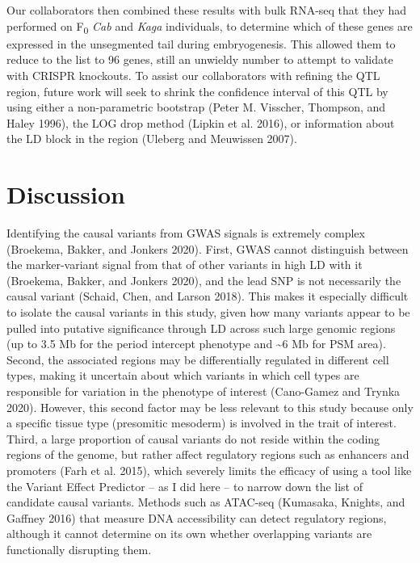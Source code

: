\documentclass[
]{book}
\begin{document}
Our collaborators then combined these results with bulk RNA-seq that they had performed on F\textsubscript{0} \emph{Cab} and \emph{Kaga} individuals, to determine which of these genes are expressed in the unsegmented tail during embryogenesis. This allowed them to reduce to the list to 96 genes, still an unwieldy number to attempt to validate with CRISPR knockouts. To assist our collaborators with refining the QTL region, future work will seek to shrink the confidence interval of this QTL by using either a non-parametric bootstrap (Peter M. Visscher, Thompson, and Haley 1996), the LOG drop method (Lipkin et al. 2016), or information about the LD block in the region (Uleberg and Meuwissen 2007).

\hypertarget{somite-discussion}{%
\section{Discussion}\label{somite-discussion}}

Identifying the causal variants from GWAS signals is extremely complex (Broekema, Bakker, and Jonkers 2020). First, GWAS cannot distinguish between the marker-variant signal from that of other variants in high LD with it (Broekema, Bakker, and Jonkers 2020), and the lead SNP is not necessarily the causal variant (Schaid, Chen, and Larson 2018). This makes it especially difficult to isolate the causal variants in this study, given how many variants appear to be pulled into putative significance through LD across such large genomic regions (up to 3.5 Mb for the period intercept phenotype and \textasciitilde6 Mb for PSM area). Second, the associated regions may be differentially regulated in different cell types, making it uncertain about which variants in which cell types are responsible for variation in the phenotype of interest (Cano-Gamez and Trynka 2020). However, this second factor may be less relevant to this study because only a specific tissue type (presomitic mesoderm) is involved in the trait of interest. Third, a large proportion of causal variants do not reside within the coding regions of the genome, but rather affect regulatory regions such as enhancers and promoters (Farh et al. 2015), which severely limits the efficacy of using a tool like the Variant Effect Predictor -- as I did here -- to narrow down the list of candidate causal variants. Methods such as ATAC-seq (Kumasaka, Knights, and Gaffney 2016) that measure DNA accessibility can detect regulatory regions, although it cannot determine on its own whether overlapping variants are functionally disrupting them.
\end{document}
